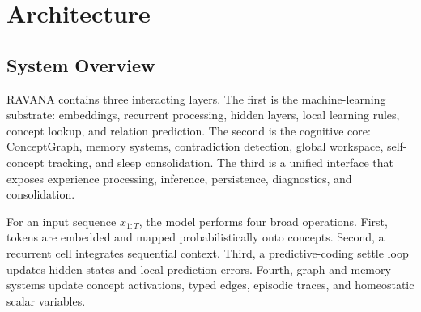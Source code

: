 \documentclass[11pt]{article}
\begin{document}
\section{Architecture}
\subsection{System Overview}
RAVANA contains three interacting layers. The first is the machine-learning substrate: embeddings, recurrent processing, hidden layers, local learning rules, concept lookup, and relation prediction. The second is the cognitive core: ConceptGraph, memory systems, contradiction detection, global workspace, self-concept tracking, and sleep consolidation. The third is a unified interface that exposes experience processing, inference, persistence, diagnostics, and consolidation.

For an input sequence $x_{1:T}$, the model performs four broad operations. First, tokens are embedded and mapped probabilistically onto concepts. Second, a recurrent cell integrates sequential context. Third, a predictive-coding settle loop updates hidden states and local prediction errors. Fourth, graph and memory systems update concept activations, typed edges, episodic traces, and homeostatic scalar variables.
\end{document}
